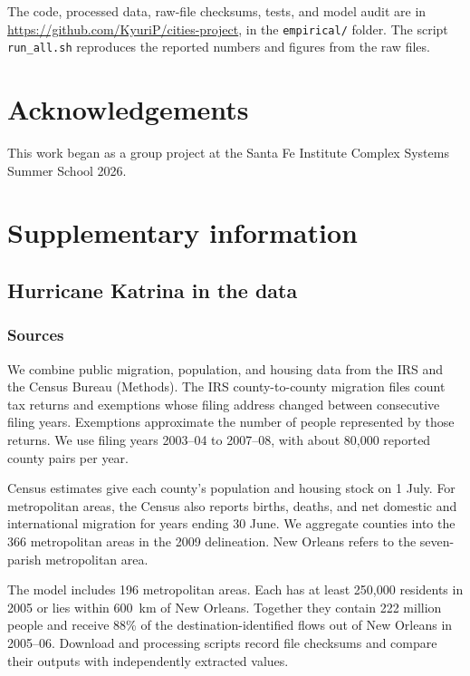 \documentclass[11pt]{article}
\begin{document}
The code, processed data, raw-file checksums, tests, and model audit are in \url{https://github.com/KyuriP/cities-project}, in the \texttt{empirical/} folder. The script \texttt{run\_all.sh} reproduces the reported numbers and figures from the raw files.

\section*{Acknowledgements}
This work began as a group project at the Santa Fe Institute Complex Systems Summer School 2026.




\clearpage
\appendix
\renewcommand{\thetable}{S\arabic{table}}
\renewcommand{\thefigure}{S\arabic{figure}}
\renewcommand{\thesubsection}{S\arabic{subsection}}
\setcounter{table}{0}
\setcounter{figure}{0}
\setcounter{subsection}{0}
\section*{Supplementary information}

\subsection{Hurricane Katrina in the data}\label{si:data}\label{sec:data}
\subsubsection{Sources}
We combine public migration, population, and housing data from the IRS and the Census Bureau (Methods). The IRS county-to-county migration files count tax returns and exemptions whose filing address changed between consecutive filing years. Exemptions approximate the number of people represented by those returns. We use filing years 2003--04 to 2007--08, with about 80{,}000 reported county pairs per year.

Census estimates give each county's population and housing stock on 1 July. For metropolitan areas, the Census also reports births, deaths, and net domestic and international migration for years ending 30 June. We aggregate counties into the 366 metropolitan areas in the 2009 delineation. New Orleans refers to the seven-parish metropolitan area.

The model includes 196 metropolitan areas. Each has at least 250{,}000 residents in 2005 or lies within 600~km of New Orleans. Together they contain 222 million people and receive 88\% of the destination-identified flows out of New Orleans in 2005--06. Download and processing scripts record file checksums and compare their outputs with independently extracted values.
\end{document}

